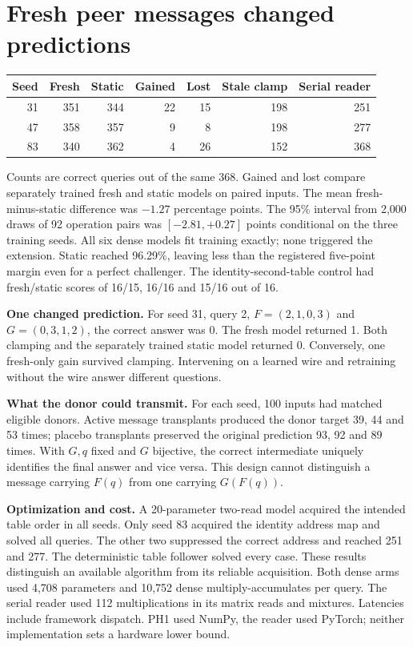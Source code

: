 \section*{Fresh peer messages changed predictions}
\begin{center}
\begin{tabular}{rrrrrrr}
\toprule
Seed & Fresh & Static & Gained & Lost & Stale clamp & Serial reader\\
\midrule
31 & 351 & 344 & 22 & 15 & 198 & 251\\
47 & 358 & 357 & 9 & 8 & 198 & 277\\
83 & 340 & 362 & 4 & 26 & 152 & 368\\
\bottomrule
\end{tabular}
\end{center}
Counts are correct queries out of the same 368. Gained and lost compare separately trained fresh and static models on paired inputs. The mean fresh-minus-static difference was $-1.27$ percentage points. The 95\% interval from 2,000 draws of 92 operation pairs was $[-2.81,+0.27]$ points conditional on the three training seeds. All six dense models fit training exactly; none triggered the extension. Static reached 96.29\%, leaving less than the registered five-point margin even for a perfect challenger. The identity-second-table control had fresh/static scores of 16/15, 16/16 and 15/16 out of 16.
\par
\textbf{One changed prediction.} For seed 31, query 2, $F=(2,1,0,3)$ and $G=(0,3,1,2)$, the correct answer was 0. The fresh model returned 1. Both clamping and the separately trained static model returned 0. Conversely, one fresh-only gain survived clamping. Intervening on a learned wire and retraining without the wire answer different questions.
\par
\textbf{What the donor could transmit.} For each seed, 100 inputs had matched eligible donors. Active message transplants produced the donor target 39, 44 and 53 times; placebo transplants preserved the original prediction 93, 92 and 89 times. With $G,q$ fixed and $G$ bijective, the correct intermediate uniquely identifies the final answer and vice versa. This design cannot distinguish a message carrying $F(q)$ from one carrying $G(F(q))$.
\par
\textbf{Optimization and cost.} A 20-parameter two-read model acquired the intended table order in all seeds. Only seed 83 acquired the identity address map and solved all queries. The other two suppressed the correct address and reached 251 and 277. The deterministic table follower solved every case. These results distinguish an available algorithm from its reliable acquisition. Both dense arms used 4,708 parameters and 10,752 dense multiply-accumulates per query. The serial reader used 112 multiplications in its matrix reads and mixtures. Latencies include framework dispatch. PH1 used NumPy, the reader used PyTorch; neither implementation sets a hardware lower bound.
